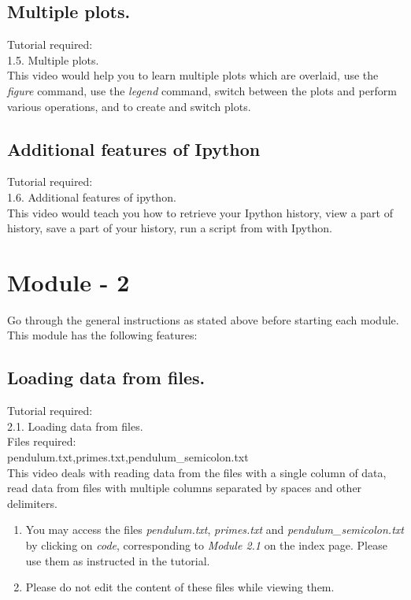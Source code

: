 \documentclass[11pt,twocolumn]{article}
\newenvironment{enumcpt}{\begin{enumerate} \topsep 0pt \partopsep 0pt 
                        \parsep 0pt
                        \itemsep 0pt \leftmargin -1in \rightmargin 0pt
                        }{\end{enumerate}}
\begin{document}
    \subsection{Multiple plots.}
    Tutorial required: \\ 1.5. Multiple plots. \\
      This video would help you to learn multiple plots which are overlaid, use the \emph{figure} command, use the \emph{legend} command, switch between the plots and perform various operations, and to create and switch plots. 

    \subsection{Additional features of Ipython}
     Tutorial required: \\ 1.6. Additional features of ipython. \\
    This video would teach you how to retrieve your Ipython history, view a part of history, save a part of your history, run a script from with Ipython. \\

\section{Module - 2}
Go through the general instructions as stated above before starting each module.\\
This module has the following features:
  \subsection{Loading data from files.}
  Tutorial required: \\ 2.1. Loading data from files. \\
  Files required:\\ pendulum.txt,primes.txt,pendulum\_semicolon.txt \\
  This video deals with reading data from the files with a single column of data, read data from files with multiple columns separated by spaces and other delimiters. 
\begin{enumcpt}
\item You may access the files \emph{pendulum.txt}, \emph{primes.txt} and \emph{pendulum\_semicolon.txt} by clicking on \emph{code}, corresponding to \emph{Module 2.1} on the index page. Please use them as instructed in the tutorial. 
\item Please do not edit the content of these files while viewing them.
\end{enumcpt}
\end{document}
